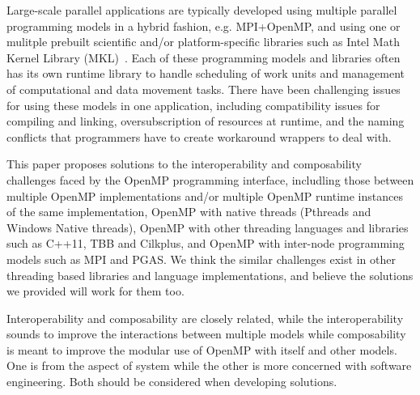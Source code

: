 \begin{comment}
(3) is heavy hammer but allows for bulk sync phased interop, which
is especially useful for libraries.
Likely more expensive than most aggressive wait policy, but the cost
of recreation is only paid after when quiesce is used explicitly, when needed.
In some cases, quiesce may just invoke deep sleep, not actually destroy
thread pool, but this still permits the threads to use low-latency
wait policy between join and fork.

\end{comment}

Large-scale parallel applications are typically developed using multiple parallel programming models in 
a hybrid fashion, e.g. MPI+OpenMP, and using one or mulitple prebuilt scientific and/or platform-specific libraries such as Intel Math Kernel Library (MKL)~\cite{wang2014intel}.
Each of these programming models and libraries often has its own runtime library to handle scheduling of work units and management of computational
and data movement tasks. 
There have been challenging issues for using these models in one application, including 
compatibility issues for compiling and linking, oversubscription of resources at runtime, and the naming conflicts that 
programmers have to create workaround wrappers to deal with.

This paper proposes solutions to the interoperability and composability challenges faced by the OpenMP programming interface, includling those
between multiple OpenMP implementations and/or multiple OpenMP runtime instances of the same implementation, OpenMP 
with native threads (Pthreads and Windows Native threads), OpenMP with other threading languages and libraries such 
as C++11, TBB and Cilkplus, and OpenMP with inter-node programming models such as MPI and PGAS. We 
think the similar challenges exist in other threading based libraries and language implementations, and believe
the solutions we provided  will work for them too.  

Interoperability and composability are closely related, while the interoperability sounds to improve the interactions between multiple models
while composability is meant to improve the modular use of OpenMP with itself and other models. One is from the aspect of system while 
the other is more concerned with software engineering. Both should be considered when developing solutions. 

